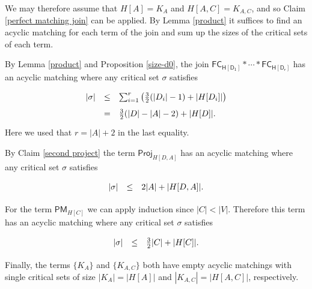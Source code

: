 \documentclass[10pt]{amsart}
\theoremstyle{definition}
\begin{document}
	We may therefore assume that $H[A] =K_A$ and $H[A,C] = K_{A,C}$, and so Claim \ref{perfect matching join} can be applied. By Lemma \ref{product} it suffices to find an acyclic matching for each term of the join and sum up the sizes of the critical sets of each term. 
	
	By Lemma \ref{product} and Proposition \ref{size-d0}, the join $\mathsf{FC_{H[D_1]}} * \cdots * \mathsf{FC_{H[D_r]}}$ has an acyclic matching where any critical set $\sigma$ satisfies
	\[\def\arraystretch{1.65}
	\begin{array}{rcl}
	|\sigma| & \leq & \textstyle{\sum}_{i=1}^r\left( \textstyle{\frac{3}{2}}(|D_i|-1) + |H[D_i]| \right) \\
	& = &   \textstyle{\frac{3}{2}}(|D|-|A|-2) + |H[D]|.
	\end{array}
	\]
	Here we used that $r = |A|+2$ in the last equality.
	
	By Claim \ref{second project} the term $\mathsf{Proj}_{H[D,A]}$ has an acyclic matching where any critical set $\sigma$ satisfies 
	\[\def\arraystretch{1.65}
	\begin{array}{rcl}
	|\sigma| & \leq & 2|A| + |H[D,A]|.
	\end{array}
	\]
	
	For the term $\mathsf{PM}_{H[C]}$ we can apply induction since $|C|<|V|$. Therefore this term has an acyclic matching where any critical set $\sigma$ satisfies 
	\[\def\arraystretch{1.65}
	\begin{array}{rcl}
	|\sigma| & \leq & \textstyle{\frac{3}{2}}|C| + |H[C]|.
	\end{array}
	\]
	
	Finally, the terms $\{K_A\}$ and $\{K_{A,C}\}$ both have empty acyclic matchings with single critical sets of size $|K_A| = |H[A]|$ and $|K_{A,C}| = |H[A,C]|$, respectively.
	
\end{document}
